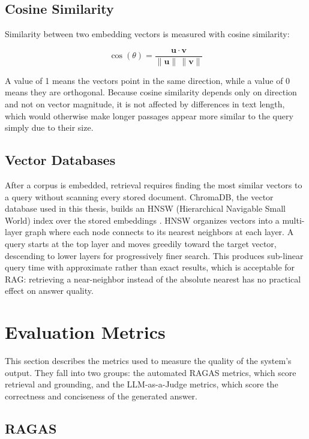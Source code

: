 \subsection{Cosine Similarity}

Similarity between two embedding vectors is measured with cosine 
similarity:

\begin{equation}
    \cos(\theta) = 
    \frac{\mathbf{u} \cdot \mathbf{v}}{\|\mathbf{u}\|\,\|\mathbf{v}\|}
\end{equation}

A value of 1 means the vectors point in the same direction, while a value 
of 0 means they are orthogonal. Because cosine similarity depends 
only on direction and not on vector magnitude, it is not affected by 
differences in text length, which would otherwise make longer passages 
appear more similar to the query simply due to their size.

\subsection{Vector Databases}

After a corpus is embedded, retrieval requires finding the most 
similar vectors to a query without scanning every stored document. 
ChromaDB, the vector database used in this thesis, builds an HNSW 
(Hierarchical Navigable Small World) index over the stored embeddings 
\cite{malkov2018hnsw}. HNSW organizes vectors into a multi-layer 
graph where each node connects to its nearest neighbors at each layer. 
A query starts at the top layer and moves greedily toward the target 
vector, descending to lower layers for progressively finer search. 
This produces sub-linear query time with approximate rather than exact 
results, which is acceptable for RAG: retrieving a near-neighbor 
instead of the absolute nearest has no practical effect on answer 
quality.

\section{Evaluation Metrics}

This section describes the metrics used to measure the quality of the system's output. They fall into two groups: the automated RAGAS metrics, which score retrieval and grounding, and the LLM-as-a-Judge metrics, which score the correctness and conciseness of the generated answer.

\subsection{RAGAS}

